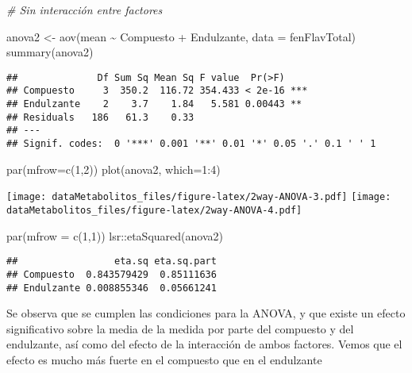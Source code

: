 \documentclass[
]{article}
\newenvironment{Shaded}{\begin{snugshade}}{\end{snugshade}}
\newcommand{\AttributeTok}[1]{\textcolor[rgb]{0.77,0.63,0.00}{#1}}
\newcommand{\CommentTok}[1]{\textcolor[rgb]{0.56,0.35,0.01}{\textit{#1}}}
\newcommand{\DecValTok}[1]{\textcolor[rgb]{0.00,0.00,0.81}{#1}}
\newcommand{\FunctionTok}[1]{\textcolor[rgb]{0.00,0.00,0.00}{#1}}
\newcommand{\NormalTok}[1]{#1}
\newcommand{\OtherTok}[1]{\textcolor[rgb]{0.56,0.35,0.01}{#1}}
\newcommand{\SpecialCharTok}[1]{\textcolor[rgb]{0.00,0.00,0.00}{#1}}
\begin{document}
\begin{Shaded}
\begin{Highlighting}[]
\CommentTok{\# Sin interacción entre factores}

\NormalTok{anova2 }\OtherTok{\textless{}{-}} \FunctionTok{aov}\NormalTok{(mean }\SpecialCharTok{\textasciitilde{}}\NormalTok{ Compuesto }\SpecialCharTok{+}\NormalTok{ Endulzante, }\AttributeTok{data =}\NormalTok{ fenFlavTotal)}
\FunctionTok{summary}\NormalTok{(anova2)}
\end{Highlighting}
\end{Shaded}

\begin{verbatim}
##              Df Sum Sq Mean Sq F value  Pr(>F)    
## Compuesto     3  350.2  116.72 354.433 < 2e-16 ***
## Endulzante    2    3.7    1.84   5.581 0.00443 ** 
## Residuals   186   61.3    0.33                    
## ---
## Signif. codes:  0 '***' 0.001 '**' 0.01 '*' 0.05 '.' 0.1 ' ' 1
\end{verbatim}

\begin{Shaded}
\begin{Highlighting}[]
\FunctionTok{par}\NormalTok{(}\AttributeTok{mfrow=}\FunctionTok{c}\NormalTok{(}\DecValTok{1}\NormalTok{,}\DecValTok{2}\NormalTok{))}
\FunctionTok{plot}\NormalTok{(anova2, }\AttributeTok{which=}\DecValTok{1}\SpecialCharTok{:}\DecValTok{4}\NormalTok{)}
\end{Highlighting}
\end{Shaded}

\texttt{[image: dataMetabolitos\_files/figure-latex/2way-ANOVA-3.pdf]}
\texttt{[image: dataMetabolitos\_files/figure-latex/2way-ANOVA-4.pdf]}

\begin{Shaded}
\begin{Highlighting}[]
\FunctionTok{par}\NormalTok{(}\AttributeTok{mfrow =} \FunctionTok{c}\NormalTok{(}\DecValTok{1}\NormalTok{,}\DecValTok{1}\NormalTok{))}
\NormalTok{lsr}\SpecialCharTok{::}\FunctionTok{etaSquared}\NormalTok{(anova2)}
\end{Highlighting}
\end{Shaded}

\begin{verbatim}
##                 eta.sq eta.sq.part
## Compuesto  0.843579429  0.85111636
## Endulzante 0.008855346  0.05661241
\end{verbatim}

Se observa que se cumplen las condiciones para la ANOVA, y que existe un
efecto significativo sobre la media de la medida por parte del compuesto
y del endulzante, así como del efecto de la interacción de ambos
factores. Vemos que el efecto es mucho más fuerte en el compuesto que en
el endulzante
\end{document}
